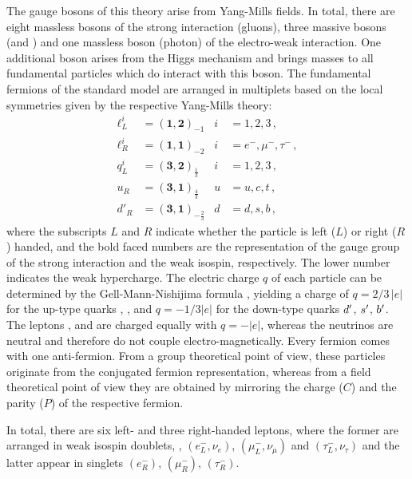 The gauge bosons of this theory arise from Yang-Mills fields.
In total, there are eight massless bosons of the strong interaction (gluons), three massive bosons (\Wpm and \PZ) and one massless boson (photon) of the electro-weak interaction.
One additional boson arises from the Higgs mechanism and brings masses to all fundamental particles which do interact with this boson.
The fundamental fermions of the standard model are arranged in multiplets based on the local symmetries given by the respective Yang-Mills theory:
\begin{align*}
  \ell^i_L &= (\mathbf{1}, \mathbf{2})_{-1} & i &= 1,2,3 \,,\\ 
  \ell^i_R &= (\mathbf{1}, \mathbf{1})_{-2} & i &= e^-,\mu^-,\tau^- \,,\\ 
  q^i_L &= (\mathbf{3}, \mathbf{2})_{\frac{1}{3}} & i &= 1,2,3 \,,\\
  u_R &= (\mathbf{3}, \mathbf{1})_{\frac{4}{3}} & u &= u,c,t \,,\\
  d'_R &= (\mathbf{3}, \mathbf{1})_{-\frac{2}{3}} & d &= d,s,b \,,
\end{align*}
where the subscripts $L$ and $R$ indicate whether the particle is left ($L$) or right ($R$) handed, and the bold faced numbers are the representation of the gauge group of the strong interaction and the weak isospin, respectively.
The lower number indicates the weak hypercharge.
The electric charge $q$ of each particle can be determined by the Gell-Mann-Nishijima formula \cite{Nishijima1955,GellMann1956}, yielding a charge of $q = 2/3 \, |e|$ for the up-type quarks \uquark, \cquark, \tquark and $q = -1/3 |e|$ for the down-type quarks ${d}'$, ${s}'$, ${b}'$.
The leptons \en, \mun and \taum are charged equally with $q=-|e|$, whereas the neutrinos are neutral and therefore do not couple electro-magnetically.  
Every fermion comes with one anti-fermion.
From a group theoretical point of view, these particles originate from the conjugated fermion representation, whereas from a field theoretical point of view they are obtained by mirroring the charge ($C$) and the parity ($P$) of the respective fermion.

In total, there are six left- and three right-handed leptons, where the former are arranged in weak isospin doublets, \ie{}, $(e_L^-, \nu_e)$, $(\mu_L^-, \nu_\mu)$ and $(\tau_L^-, \nu_\tau)$ and the latter appear in singlets $(e_R^-)$, $(\mu_R^-)$, $(\tau_R^-)$.

